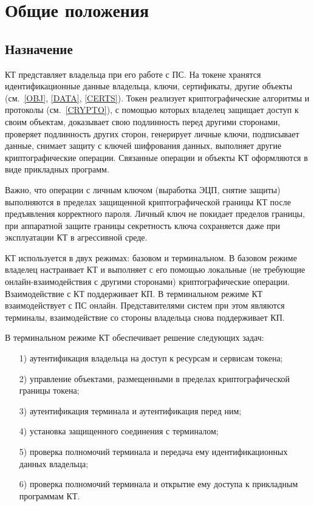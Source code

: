 \chapter{Общие положения}\label{COMMON}

\section{Назначение}

КТ представляет владельца при его работе с ПС.
На токене хранятся идентификационные данные владельца, ключи, сертификаты, 
другие объекты (см.~\ref{OBJ}, \ref{DATA}, \ref{CERTS}). 
%
Токен реализует криптографические алгоритмы и протоколы (см.~\ref{CRYPTO}), 
с помощью которых владелец защищает доступ к своим объектам, 
доказывает свою подлинность перед другими сторонами, 
проверяет подлинность других сторон, генерирует личные ключи, подписывает 
данные, снимает защиту с ключей шифрования данных, выполняет другие 
криптографические операции.
%
Связанные операции и объекты КТ оформляются в виде прикладных программ. 

Важно, что операции с личным ключом (выработка ЭЦП, снятие защиты) выполняются  
в пределах защищенной криптографической границы КТ после предъявления 
корректного пароля. Личный ключ не покидает пределов границы, при аппаратной 
защите границы секретность ключа сохраняется даже при эксплуатации КТ в 
агрессивной среде.

КТ используется в двух режимах: базовом и терминальном.
%
В базовом режиме владелец настраивает КТ и выполняет с его помощью 
локальные (не требующие онлайн-взаимодействия с другими сторонами) 
криптографические операции. Взаимодействие с КТ поддерживает КП. 
%
В терминальном режиме КТ взаимодействует с ПС онлайн. Представителями систем 
при этом являются терминалы, взаимодействие со стороны владельца снова 
поддерживает КП.

В терминальном режиме КТ обеспечивает решение следующих задач: 
\begin{enumerate}
\item[1)]
аутентификация владельца на доступ к ресурсам и сервисам токена; 
\item[2)]
управление объектами, размещенными в пределах криптографической границы токена;
\item[3)]
аутентификация терминала и аутентификация перед ним;
\item[4)]
установка защищенного соединения с терминалом;
\item[5)]
проверка полномочий терминала и передача ему идентификационных данных владельца;
\item[6)]
проверка полномочий терминала и открытие ему доступа к прикладным программам КТ. 
\end{enumerate}

